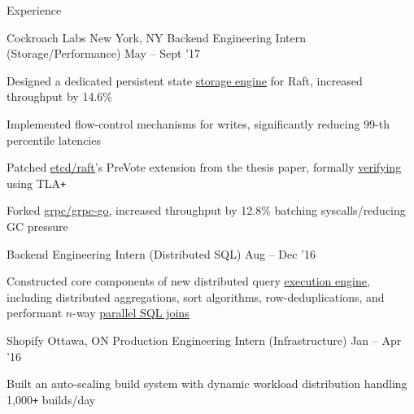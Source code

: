 \documentclass{resume} %
\begin{document}
\begin{rSection}{Experience}
  \begin{rDualWorkSection}{Cockroach Labs}
                     {New York, NY}
                     {Backend Engineering Intern (Storage/Performance)}
                     {May -- Sept '17}
  {
    \item Designed a dedicated persistent state
      \href{https://github.com/cockroachdb/cockroach/pull/16361}{\underline
      {storage engine}} for Raft, increased throughput by 14.6\%
    \item Implemented flow-control mechanisms for writes, significantly
      reducing 99-th percentile latencies
    \item Patched
      \href{https://github.com/coreos/etcd/pull/8288}{\underline{etcd/raft}}'s
      PreVote extension from the thesis paper, formally
      \href{https://github.com/irfansharif/raft.tla/commit/22b05818b6bcfe6719a708f2270a1308fecbc0fa}{\underline
      {verifying}} using TLA\texttt{+}
    \item Forked
      \href{https://github.com/irfansharif/grpc-go}{\underline{grpc/grpc-go}},
      increased throughput by 12.8\% batching syscalls/reducing GC pressure
  }
  {Backend Engineering Intern (Distributed SQL)}
  {Aug -- Dec '16}
  {
     \item Constructed core components of new distributed query
       \href{https://github.com/cockroachdb/cockroach/blob/master/docs/RFCS/20160421_distributed_sql.md}
       {\underline{execution engine}}, including distributed aggregations, sort
       algorithms, row-deduplications, and performant $n$-way
       \href{https://www.cockroachlabs.com/blog/better-sql-joins-in-cockroachdb/}
       {\underline{parallel SQL joins}}
  }
  \end{rDualWorkSection}

  \begin{rWorkSection}{Shopify}
                     {Ottawa, ON}
                     {Production Engineering Intern (Infrastructure)}
                     {Jan -- Apr '16}
  {
    \item Built an auto-scaling build system with dynamic workload distribution
      handling 1,000\texttt{+} builds/day
  }
  \end{rWorkSection}
\end{rSection}

\end{document}

